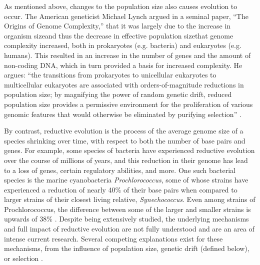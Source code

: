 As mentioned above, changes to the population size also causes evolution to occur. The American geneticist Michael Lynch argued in a seminal paper, ``The Origins of Genome Complexity,'' that it was largely due to the increase in organism size\textemdash and thus the decrease in effective population size\textemdash that genome complexity increased, both in prokaryotes (e.g. bacteria) and eukaryotes (e.g. humans). This resulted in an increase in the number of genes and the amount of non-coding DNA, which in turn provided a basis for increased complexity. He argues: ``the transitions from prokaryotes to unicellular eukaryotes to multicellular eukaryotes are associated with orders-of-magnitude reductions in population size; by magnifying the power of random genetic drift, reduced population size provides a permissive environment for the proliferation of various genomic features that would otherwise be eliminated by purifying selection'' \cite{Lynch1401}. 

By contrast, reductive evolution is the process of the average genome size of a species shrinking over time, with respect to both the number of base pairs and genes. For example, some species of bacteria have experienced reductive evolution over the course of millions of years, and this reduction in their genome has lead to a loss of genes, certain regulatory abilities, and more. One such bacterial species is the marine cyanobacteria \textit{Prochlorococcus}, some of whose strains have experienced a reduction of nearly 40\% of their base pairs when compared to larger strains of their closest living relative, \textit{Synechococcus}. Even among strains of Prochlorococcus, the difference between some of the larger and smaller strains is upwards of 38\% \cite{Batut.2014}. Despite being extensively studied, the underlying mechanisms and full impact of reductive evolution are not fully understood and are an area of intense current research. Several competing explanations exist for these mechanisms, from the influence of population size, genetic drift (defined below), or selection \cite{Batut.2014}.

